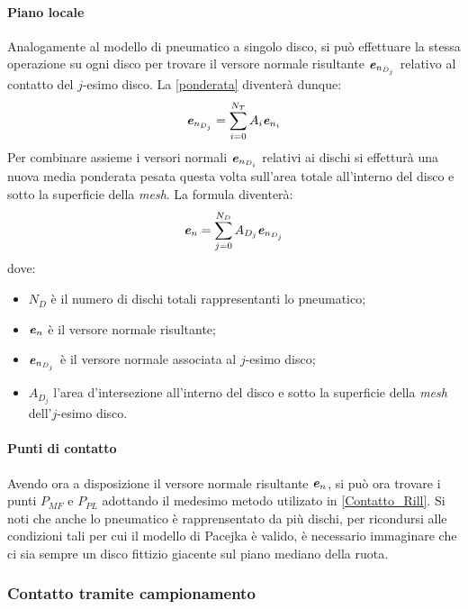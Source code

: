 \paragraph{Piano locale}
Analogamente al modello di pneumatico a singolo disco, si può effettuare la stessa operazione su ogni disco per trovare il versore normale risultante $\textbf{\textit{e}}_{n_{D_j}}$ relativo al contatto del $j$-esimo disco. La \eqref{ponderata} diventerà dunque:
%
\begin{equation}
\textbf{\textit{e}}_{n_{D_j}} = \sum_{i=0}^{N_T}A_i\textbf{\textit{e}}_{n_i}
\end{equation}
%
Per combinare assieme i versori normali $\textbf{\textit{e}}_{n_{D_i}}$ relativi ai dischi si effetturà una nuova media ponderata pesata questa volta sull'area totale all'interno del disco e sotto la superficie della \textit{mesh}. La formula diventerà:
%
\begin{equation}
\textbf{\textit{e}}_n = \sum_{j=0}^{N_D}A_{D_j}\textbf{\textit{e}}_{n_{D_j}}
\end{equation}
%
dove:
\begin{itemize}
	\item $N_D$ è il numero di dischi totali rappresentanti lo pneumatico;
	\item $\textbf{\textit{e}}_n$ è il versore normale risultante;
	\item $\textbf{\textit{e}}_{n_{D_j}}$ è il versore normale associata al $j$-esimo disco;
	\item $A_{D_j}$ l'area d'intersezione all'interno del disco e sotto la superficie della \textit{mesh} dell'$j$-esimo disco.
\end{itemize}

\paragraph{Punti di contatto}
Avendo ora a disposizione il versore normale risultante $\textbf{\textit{e}}_n$, si può ora trovare i punti $P_{MF}$ e $P_{PL}$ adottando il medesimo metodo utilizato in \ref{Contatto_Rill}. Si noti che anche lo pneumatico è rapprensentato da più dischi, per ricondursi alle condizioni tali per cui il modello di Pacejka è valido, è necessario immaginare che ci sia sempre un disco fittizio giacente sul piano mediano della ruota.
%
\subsubsection{Contatto tramite campionamento}
